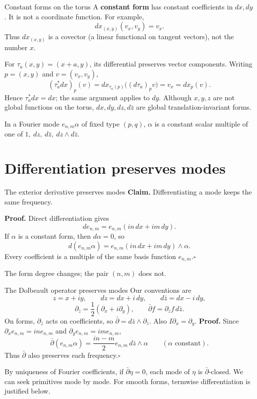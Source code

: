 \documentclass[aspectratio=169,11pt]{beamer}
\newcommand{\db}{\bar\partial}
\newcommand{\ee}{e_{n,m}}
\newcommand{\pbarz}{\partial_{\bar z}}
\begin{document}
\begin{frame}{Constant forms on the torus}
A \textbf{constant form} has constant coefficients in $dx,dy$.
It is not a coordinate function. For example,
\[
 dx_{(x,y)}(v_x,v_y)=v_x.
\]
Thus $dx_{(x,y)}$ is a covector (a linear functional on tangent vectors),
not the number $x$.

For $\tau_a(x,y)=(x+a,y)$, its differential preserves vector components.
Writing $p=(x,y)$ and $v=(v_x,v_y)$,
\[
 (\tau_a^*dx)_p(v)
 =dx_{\tau_a(p)}\bigl((d\tau_a)_p v\bigr)
 =v_x=dx_p(v).
\]
Hence $\tau_a^*dx=dx$; the same argument applies to $dy$.
Although $x,y,z$ are not global functions on the torus,
$dx,dy,dz,d\bar z$ are global translation-invariant forms.

In a Fourier mode $\ee\alpha$ of fixed type $(p,q)$,
$\alpha$ is a constant scalar multiple of one of
$1,\ dz,\ d\bar z,\ dz\wedge d\bar z$.
\end{frame}

\section{Differentiation preserves modes}
\begin{frame}{The exterior derivative preserves modes}
\textbf{Claim.} Differentiating a mode keeps the same frequency.

\textbf{Proof.} Direct differentiation gives
\[
 d\ee=\ee(in\,dx+im\,dy).
\]
If $\alpha$ is a constant form, then $d\alpha=0$, so
\[
 d(\ee\alpha)=\ee(in\,dx+im\,dy)\wedge\alpha.
\]
Every coefficient is a multiple of the same basis function $\ee$.\hfill$\square$

The form degree changes; the pair $(n,m)$ does not.
\end{frame}

\begin{frame}{The Dolbeault operator preserves modes}
Our conventions are
\[
 z=x+iy,\qquad dz=dx+i\,dy,\qquad d\bar z=dx-i\,dy,
\]
\[
 \pbarz=\frac12(\partial_x+i\partial_y),\qquad
 \db f=\pbarz f\,d\bar z.
\]
On forms, $\pbarz$ acts on coefficients, so $\db=d\bar z\wedge\pbarz$.
Also $I\partial_x=\partial_y$.
\textbf{Proof.} Since $\partial_x\ee=in\ee$ and
$\partial_y\ee=im\ee$,
\[
 \db(\ee\alpha)=\frac{in-m}{2}\ee\,d\bar z\wedge\alpha
 \qquad(\alpha\text{ constant}).
\]
Thus $\db$ also preserves each frequency.\hfill$\square$

By uniqueness of Fourier coefficients, if $\db\eta=0$,
each mode of $\eta$ is $\db$-closed. We can seek primitives mode by mode.
For smooth forms, termwise differentiation is justified below.
\end{frame}
\end{document}
